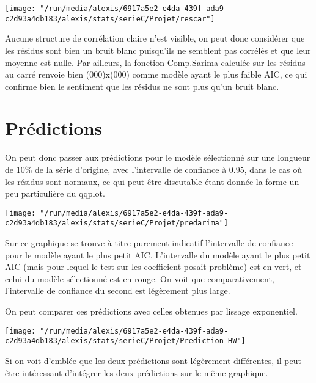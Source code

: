 \documentclass[11pt,a4paper]{article}
\begin{document}
\begin{center}

\texttt{[image: "/run/media/alexis/6917a5e2-e4da-439f-ada9-c2d93a4db183/alexis/stats/serieC/Projet/rescar"]}
\end{center}

Aucune structure de corrélation claire n'est visible, on peut donc considérer que les résidus sont bien un bruit blanc puisqu'ils ne semblent pas corrélés et que leur moyenne est nulle. Par ailleurs, la fonction Comp.Sarima calculée sur les résidus au carré renvoie bien (000)x(000) comme modèle ayant le plus faible AIC, ce qui confirme bien le sentiment que les résidus ne sont plus qu'un bruit blanc.

\section{Prédictions}

On peut donc passer aux prédictions pour le modèle sélectionné sur une longueur de 10\% de la série d'origine, avec l'intervalle de confiance à 0.95, dans le cas où les résidus sont normaux, ce qui peut être discutable étant donnée la forme un peu particulière du qqplot.

\begin{center}
\texttt{[image: "/run/media/alexis/6917a5e2-e4da-439f-ada9-c2d93a4db183/alexis/stats/serieC/Projet/predarima"]}
\end{center}

Sur ce graphique se trouve à titre purement indicatif l'intervalle de confiance pour le modèle ayant le plus petit AIC. L'intervalle du modèle ayant le plus petit AIC (mais pour lequel le test sur les coefficient posait problème) est en vert, et celui du modèle sélectionné est en rouge. On voit que comparativement, l'intervalle de confiance du second est légèrement plus large.

On peut comparer ces prédictions avec celles obtenues par lissage exponentiel.



\begin{center}
\texttt{[image: "/run/media/alexis/6917a5e2-e4da-439f-ada9-c2d93a4db183/alexis/stats/serieC/Projet/Prediction-HW"]}
\end{center}

Si on voit d'emblée que les deux prédictions sont légèrement différentes, il peut être intéressant d'intégrer les deux prédictions sur le même graphique.
\end{document}
